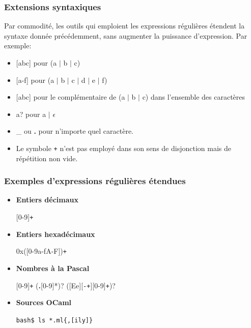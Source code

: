 %
\begin{frame}
\frametitle{Extensions syntaxiques}

Par commodité, les outils qui emploient les expressions régulières
étendent la syntaxe donnée précédemment, sans augmenter la puissance
d'expression. Par exemple:
\begin{itemize}

  \item \textsf{[abc]} pour \textsf{(a \(\lvert\) b \(\lvert\) c)}

  \item \textsf{[a-f]} pour \textsf{(a \(\lvert\) b \(\lvert\) c
    \(\lvert\) d \(\lvert\) e \(\lvert\) f)}

  \item \textsf{[abc]} pour le complémentaire de
  \textsf{(a \(\lvert\) b \(\lvert\) c)} dans l'ensemble des
  caractères

  \item \textsf{a?} pour \textsf{a \(\lvert\) $\epsilon$}

  \item \textsf{\Large \_} ou \textsf{\textbf{.}} pour n'importe
  quel caractère.

\end{itemize}

\remarque

\begin{itemize}

  \item Le symbole \texttt{+} n'est pas employé dans son
  sens de disjonction mais de répétition non vide.

\end{itemize}

\end{frame}

%
\begin{frame}
\frametitle{Exemples d'expressions régulières étendues}

\begin{itemize}

  \item \textbf{Entiers décimaux}

  \centerline{\textsf{[0-9]\texttt{+}}}

  \item \textbf{Entiers hexadécimaux}

  \centerline{\textsf{0x([0-9a-fA-F])\texttt{+}}}

  \item \textbf{Nombres à la Pascal}

  \centerline{\textsf{[0-9]\texttt{+} (\textbf{.}[0-9]*)?
  ([Ee][\texttt{-+}][0-9]\texttt{+})?}}

  \item \textbf{Sources OCaml}

  \centerline{\texttt{bash\$ ls *.ml\{,[ily]\}}}

\end{itemize}

\end{frame}

